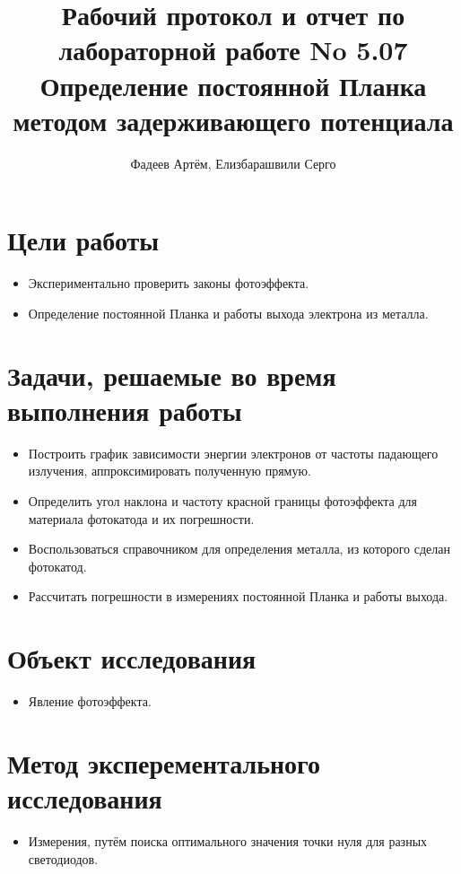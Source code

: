 \documentclass[12pt, a4paper]{article}
\title{Рабочий протокол и отчет по лабораторной работе No 5.07
\\ Определение постоянной Планка методом задерживающего потенциала
}
\author{Фадеев Артём, Елизбарашвили Серго }
\begin{document}
\maketitle

\section{Цели работы}

\begin{itemize}
    \item Экспериментально проверить законы фотоэффекта.
    \item Определение постоянной Планка и работы выхода электрона из металла.
\end{itemize}

\section{Задачи, решаемые во время выполнения работы}

\begin{itemize}
    \item Построить график зависимости энергии электронов от частоты падающего излучения, аппроксимировать полученную прямую.
    \item Определить угол наклона и частоту красной границы фотоэффекта для материала фотокатода и их погрешности.
    \item Воспользоваться справочником для определения металла, из которого сделан фотокатод.
    \item Рассчитать погрешности в измерениях постоянной Планка и работы выхода.
\end{itemize}

\section{Объект исследования}
\begin{itemize}
    \item Явление фотоэффекта.
\end{itemize}

\section{Метод эксперементального исследования}
\begin{itemize}
    \item Измерения, путём поиска оптимального значения точки нуля для разных светодиодов.
\end{itemize}
\end{document}
